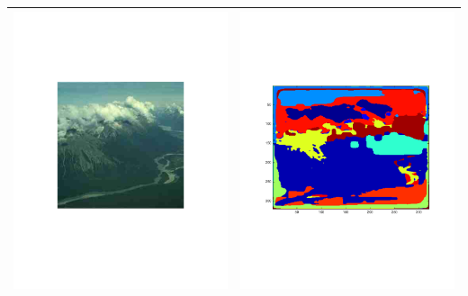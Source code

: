 \documentclass[12pt]{article}
\begin{document}
\begin{longtable}{| c | c |}
  \includegraphics[trim=40mm 40mm 40mm 40mm,clip=true,width=0.45\linewidth]{images/landscape_1.pdf} & \includegraphics[trim=25mm 25mm 25mm 25mm,clip=true,width=0.45\linewidth]{images/landscape_2.pdf} \\
  \hline

\end{longtable}
\end{document}
